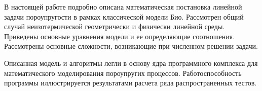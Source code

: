 %
% 
% 

В настоящей работе подробно описана математическая постановка
линейной задачи пороупругости в рамках классической модели Био. 
Рассмотрен общий случай неизотермической геометрически и
физически линейной среды. Приведены основные уравнения модели и ее
определяющие соотношения. Рассмотрены основные сложности, возникающие
при численном решении задачи. 

Описанная модель и алгоритмы легли в основу ядра программного комплекса для 
математического моделирования пороупругих процессов. Работоспособность
программы иллюстрируется результатами расчета ряда распространенных тестов.
\endinput
